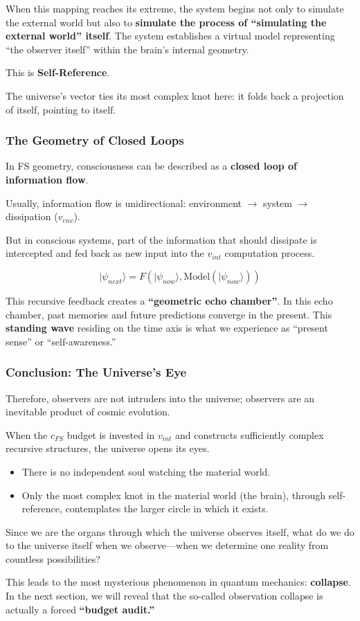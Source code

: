 When this mapping reaches its extreme, the system begins not only to simulate the external world but also to \textbf{simulate the process of ``simulating the external world'' itself}. The system establishes a virtual model representing ``the observer itself'' within the brain's internal geometry.

This is \textbf{Self-Reference}.

The universe's vector ties its most complex knot here: it folds back a projection of itself, pointing to itself.

\subsubsection{The Geometry of Closed Loops}

In FS geometry, consciousness can be described as a \textbf{closed loop of information flow}.

Usually, information flow is unidirectional: environment $\to$ system $\to$ dissipation ($v_{env}$).

But in conscious systems, part of the information that should dissipate is intercepted and fed back as new input into the $v_{int}$ computation process.

\[|\psi_{next}\rangle = F(|\psi_{now}\rangle, \text{Model}(|\psi_{now}\rangle))\]

This recursive feedback creates a \textbf{``geometric echo chamber''}. In this echo chamber, past memories and future predictions converge in the present. This \textbf{standing wave} residing on the time axis is what we experience as ``present sense'' or ``self-awareness.''

\subsubsection{Conclusion: The Universe's Eye}

Therefore, observers are not intruders into the universe; observers are an inevitable product of cosmic evolution.

When the $c_{FS}$ budget is invested in $v_{int}$ and constructs sufficiently complex recursive structures, the universe opens its eyes.

\begin{itemize}
\item There is no independent soul watching the material world.

\item Only the most complex knot in the material world (the brain), through self-reference, contemplates the larger circle in which it exists.
\end{itemize}

Since we are the organs through which the universe observes itself, what do we do to the universe itself when we observe---when we determine one reality from countless possibilities?

This leads to the most mysterious phenomenon in quantum mechanics: \textbf{collapse}. In the next section, we will reveal that the so-called observation collapse is actually a forced \textbf{``budget audit.''}

